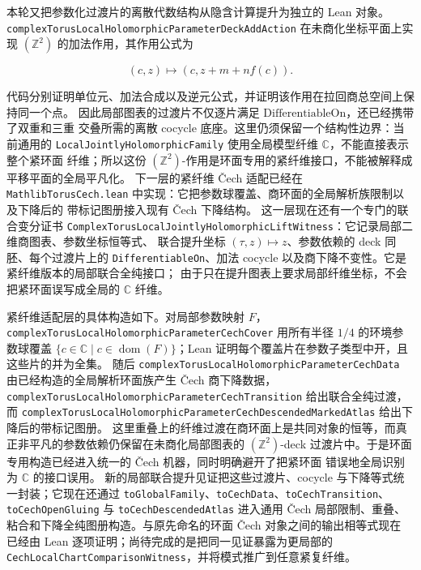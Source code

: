 \documentclass[UTF8,fontset=none,a4paper,11pt]{ctexart}
\begin{document}
\begin{sloppypar}
本轮又把参数化过渡片的离散代数结构从隐含计算提升为独立的 Lean 对象。
\texttt{complexTorusLocalHolomorphicParameterDeckAddAction} 在未商化坐标平面上实现
\((\mathbb Z^2)\) 的加法作用，其作用公式为

\[
 (c,z)\longmapsto(c,z+m+n f(c)).
\]

代码分别证明单位元、加法合成以及逆元公式，并证明该作用在拉回商总空间上保持同一个点。
因此局部图表的过渡片不仅逐片满足 \(\mathrm{DifferentiableOn}\)，还已经携带了双重和三重
交叠所需的离散 cocycle 底座。这里仍须保留一个结构性边界：当前通用的
\texttt{LocalJointlyHolomorphicFamily} 使用全局模型纤维 \(\mathbb C\)，不能直接表示整个紧环面
纤维；所以这份 \((\mathbb Z^2)\)-作用是环面专用的紧纤维接口，不能被解释成平移平面的全局平凡化。
下一层的紧纤维 Čech 适配已经在
\texttt{MathlibTorusCech.lean} 中实现：它把参数球覆盖、商环面的全局解析族限制以及下降后的
带标记图册接入现有 Čech 下降结构。
这一层现在还有一个专门的联合变分证书
\texttt{ComplexTorusLocalJointlyHolomorphicLiftWitness}：它记录局部二维商图表、参数坐标恒等式、
联合提升坐标 \((\tau,z)\mapsto z\)、参数依赖的 deck 同胚、每个过渡片上的
\texttt{DifferentiableOn}、加法 cocycle 以及商下降不变性。它是紧纤维版本的局部联合全纯接口；
由于只在提升图表上要求局部纤维坐标，不会把紧环面误写成全局的 \(\mathbb C\) 纤维。
\end{sloppypar}

\begin{sloppypar}
紧纤维适配层的具体构造如下。对局部参数映射 \(F\)，
\texttt{complexTorusLocalHolomorphic\allowbreak Parameter\allowbreak CechCover} 用所有半径 \(1/4\) 的环境参数球覆盖
\(\{c\in\mathbb C\mid c\in\operatorname{dom}(F)\}\)；Lean 证明每个覆盖片在参数子类型中开，且这些片的并为全集。
随后 \texttt{complexTorusLocalHolomorphicParameterCechData} 由已经构造的全局解析环面族产生
Čech 商下降数据，\texttt{complexTorusLocalHolomorphicParameterCechTransition} 给出联合全纯过渡，
而 \texttt{complexTorusLocalHolomorphicParameterCechDescendedMarkedAtlas} 给出下降后的带标记图册。
这里重叠上的纤维过渡在商环面上是共同对象的恒等，而真正非平凡的参数依赖仍保留在未商化局部图表的
\((\mathbb Z^2)\)-deck 过渡片中。于是环面专用构造已经进入统一的 Čech 机器，同时明确避开了把紧环面
错误地全局识别为 \(\mathbb C\) 的接口误用。
新的局部联合提升见证把这些过渡片、cocycle 与下降等式统一封装；它现在还通过
\texttt{toGlobalFamily}、\texttt{toCechData}、\texttt{toCechTransition}、
\texttt{toCechOpenGluing} 与 \texttt{toCechDescendedAtlas} 进入通用 Čech
局部限制、重叠、粘合和下降全纯图册构造。与原先命名的环面 Čech 对象之间的输出相等式现在
已经由 Lean 逐项证明；尚待完成的是把同一见证暴露为更局部的
\texttt{CechLocalChartComparisonWitness}，并将模式推广到任意紧复纤维。
\end{sloppypar}
\end{document}
